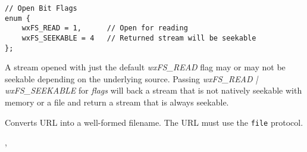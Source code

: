 \begin{verbatim}
// Open Bit Flags
enum {
    wxFS_READ = 1,      // Open for reading
    wxFS_SEEKABLE = 4   // Returned stream will be seekable
};
\end{verbatim}

A stream opened with just the default {\it wxFS\_READ} flag may
or may not be seekable depending on the underlying source.
Passing {\it wxFS\_READ | wxFS\_SEEKABLE} for {\it flags} will
back a stream that is not natively seekable with memory or a file
and return a stream that is always seekable.


\label{wxfilesystemurltofilename}


Converts URL into a well-formed filename. The URL must use the {\tt file} 
protocol.


, 


